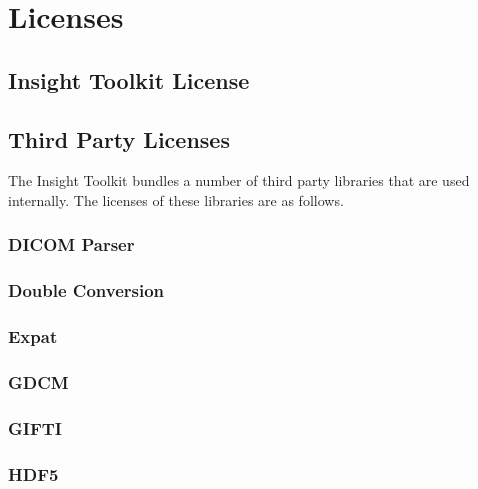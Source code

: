 \chapter{Licenses}

\section{Insight Toolkit License}



\section{Third Party Licenses}
The Insight Toolkit bundles a number of third party libraries that are used
internally.  The licenses of these libraries are as follows.

\subsection{DICOM Parser}


\subsection{Double Conversion}


\subsection{Expat}


\subsection{GDCM}


\subsection{GIFTI}


\subsection{HDF5}



